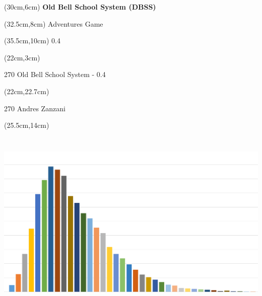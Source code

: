 \documentclass[10pt,a4paper]{article}
\def \versione {0.4}
\begin{document}
\pdfpagewidth=459.26mm
\thispagestyle{empty}

\begin{textblock*}{20cm}(30cm,6cm) %
\Huge \textbf{Old Bell School System (DBSS)}\\

\end{textblock*}

\begin{textblock*}{20cm}(32.5cm,8cm) %
\calligra\Huge{Adventures Game}\\

\end{textblock*}

\begin{textblock*}{20cm}(35.5cm,10cm) %
		{\LARGE \versione}
\end{textblock*}

\begin{textblock*}{20cm}(22cm,3cm) %
\begin{turn}{270}
	{\Huge Old Bell School System - \versione}\\
\end{turn}
\end{textblock*}


\begin{textblock*}{20cm}(22cm,22.7cm) %
\begin{turn}{270}
	{\Huge Andres Zanzani}
\end{turn}
\end{textblock*}



\begin{textblock*}{20cm}(25.5cm,14cm) %
	\includegraphics[bb=0 0 1148 636,width=6.85139in,height=3.79514in]{copertina.png}
\end{textblock*}
\end{document}
